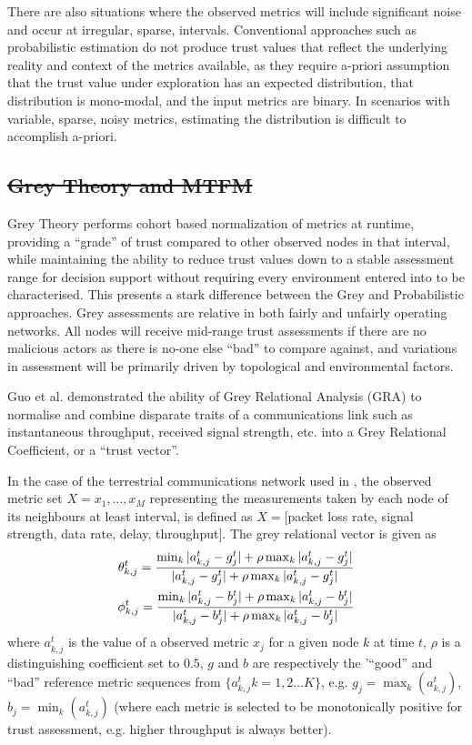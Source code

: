 \documentclass[conference]{IEEEtran}
\providecommand{\DIFadd}[1]{{\protect\color{blue}\uwave{#1}}} %
\providecommand{\DIFdel}[1]{{\protect\color{red}\sout{#1}}}                      %
\providecommand{\DIFaddbegin}{} %
\providecommand{\DIFaddend}{} %
\providecommand{\DIFdelbegin}{} %
\providecommand{\DIFdelend}{} %
\begin{document}
There are also situations where the observed metrics will include significant noise and occur at irregular, sparse, intervals.
Conventional approaches such as probabilistic estimation do not produce trust values that reflect the underlying reality and context of the metrics available, as they require a-priori assumption that the trust value under exploration has an expected distribution, that distribution is mono-modal, and the input metrics are binary.
In scenarios with variable, sparse, noisy metrics, estimating the distribution is difficult to accomplish a-priori.

\subsection{\DIFdelbegin \DIFdel{Grey Theory and MTFM}\DIFdelend \DIFaddbegin \DIFadd{Multi-Metric Trust Frameworks}\DIFaddend }\DIFaddbegin \label{sec:multimetrictrust}
\DIFaddend 

Grey Theory performs cohort based normalization of metrics at runtime, providing a ``grade'' of trust compared to other observed nodes in that interval, while maintaining the ability to reduce trust values down to a stable assessment range for decision support without requiring every environment entered into to be characterised.
This presents a stark difference between the Grey and Probabilistic approaches.
Grey assessments are relative in both fairly and unfairly operating networks.
All nodes will receive mid-range trust assessments if there are no malicious actors as there is no-one else ``bad'' to compare against, and variations in assessment will be primarily driven by topological and environmental factors.

Guo et al.\cite{Guo11} demonstrated the ability of Grey Relational Analysis (GRA)\cite{Zuo1995} to normalise and combine disparate traits of a communications link such as instantaneous throughput, received signal strength, etc. into a Grey Relational Coefficient, or a ``trust vector''.

In the case of the terrestrial communications network used in \cite{Guo11}, the observed metric set $X = {x_1,\dots,x_M}$ representing the measurements taken by each node of its neighbours at least interval, is defined as $X=[$packet loss rate, signal strength, data rate, delay, throughput$]$.
The grey relational vector is given as
%
\begin{align}
  \label{eq:grc}
  \theta_{k,j}^t = \frac{\min_k|a_{k,j}^t - g_j^t| + \rho \max_k|a_{k,j}^t-g_j^t|}{|a_{k,j}^t-g_j^t| + \rho \max_k|a_{k,j}^t-g_j^t|} \\
  \phi_{k,j}^t = \frac{\min_k|a_{k,j}^t - b_j^t| + \rho \max_k|a_{k,j}^t-b_j^t|}{|a_{k,j}^t-b_j^t| + \rho \max_k|a_{k,j}^t-b_j^t|} \notag 
\end{align}
%
where $a_{k,j}^t$ is the value of a observed metric $x_j$ for a given node $k$ at time $t$, $\rho$ is a distinguishing coefficient set to $0.5$, $g$ and $b$ are respectively the '``good'' and ``bad'' reference metric sequences from $\{a_{k,j}^t k=1,2\dots K\}$, e.g. $g_j=\max_k({a_{k,j}^t})$,  $b_j=\min_k({a_{k,j}^t})$ (where each metric is selected to be monotonically positive for trust assessment, e.g. higher throughput is always better). 
\end{document}

